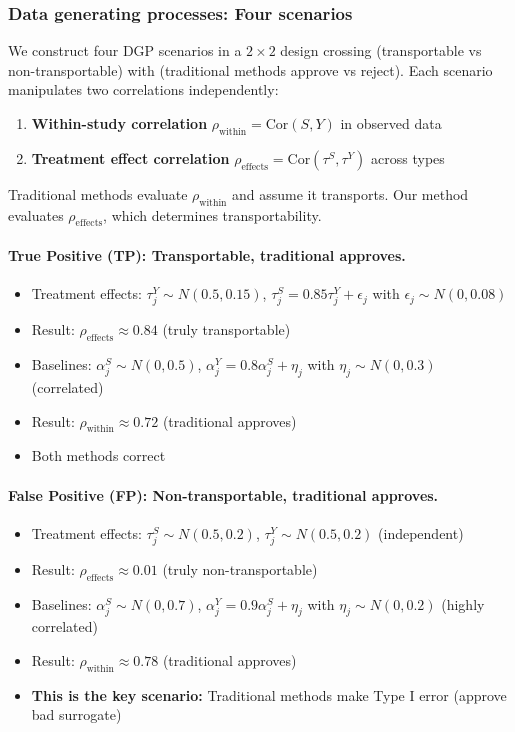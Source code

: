 \subsubsection{Data generating processes: Four scenarios}

We construct four DGP scenarios in a $2 \times 2$ design crossing (transportable vs non-transportable) with (traditional methods approve vs reject). Each scenario manipulates two correlations independently:
\begin{enumerate}
    \item \textbf{Within-study correlation} $\rho_{\text{within}} = \text{Cor}(S, Y)$ in observed data
    \item \textbf{Treatment effect correlation} $\rho_{\text{effects}} = \text{Cor}(\tau^S, \tau^Y)$ across types
\end{enumerate}

Traditional methods evaluate $\rho_{\text{within}}$ and assume it transports. Our method evaluates $\rho_{\text{effects}}$, which determines transportability.

\paragraph{True Positive (TP): Transportable, traditional approves.}
\begin{itemize}
    \item Treatment effects: $\tau_j^Y \sim N(0.5, 0.15)$, $\tau_j^S = 0.85 \tau_j^Y + \epsilon_j$ with $\epsilon_j \sim N(0, 0.08)$
    \item Result: $\rho_{\text{effects}} \approx 0.84$ (truly transportable)
    \item Baselines: $\alpha_j^S \sim N(0, 0.5)$, $\alpha_j^Y = 0.8 \alpha_j^S + \eta_j$ with $\eta_j \sim N(0, 0.3)$ (correlated)
    \item Result: $\rho_{\text{within}} \approx 0.72$ (traditional approves)
    \item Both methods correct
\end{itemize}

\paragraph{False Positive (FP): Non-transportable, traditional approves.}
\begin{itemize}
    \item Treatment effects: $\tau_j^S \sim N(0.5, 0.2)$, $\tau_j^Y \sim N(0.5, 0.2)$ (independent)
    \item Result: $\rho_{\text{effects}} \approx 0.01$ (truly non-transportable)
    \item Baselines: $\alpha_j^S \sim N(0, 0.7)$, $\alpha_j^Y = 0.9 \alpha_j^S + \eta_j$ with $\eta_j \sim N(0, 0.2)$ (highly correlated)
    \item Result: $\rho_{\text{within}} \approx 0.78$ (traditional approves)
    \item \textbf{This is the key scenario:} Traditional methods make Type I error (approve bad surrogate)
\end{itemize}

